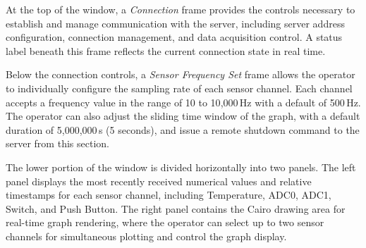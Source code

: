 At the top of the window, a \textit{Connection} frame provides the
controls necessary to establish and manage communication with the server,
including server address configuration, connection management, and
data acquisition control. A status label beneath this frame reflects the
current connection state in real time.

Below the connection controls, a \textit{Sensor Frequency Set} frame
allows the operator to individually configure the sampling rate of each
sensor channel. Each channel accepts a frequency value in the range of
10 to 10{,}000\,Hz with a default of 500\,Hz. The operator can also
adjust the sliding time window of the graph, with a default duration of
5{,}000{,}000\,\textmu s (5 seconds), and issue a remote shutdown command
to the server from this section.

The lower portion of the window is divided horizontally into two panels.
The left panel displays the most recently received numerical values and
relative timestamps for each sensor channel, including Temperature, ADC0,
ADC1, Switch, and Push Button. The right panel contains the Cairo drawing
area for real-time graph rendering, where the operator can select up to
two sensor channels for simultaneous plotting and control the graph
display.

